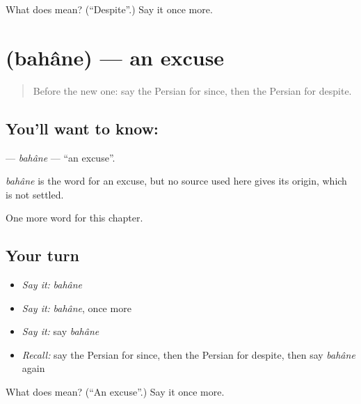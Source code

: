 \begin{tcolorbox}[breakable,colback=teal!4,colframe=teal!35!black,title={Before you move on}]
What does   mean? (\textquotedblleft{}Despite\textquotedblright{}.) Say it once more.
\end{tcolorbox}
\section[\texorpdfstring{\fa{بهانه} (bahâne)}{بهانه (bahâne)}]{ (bahâne) — an excuse}

\label{lesson:FA-C270-bahane}



\begin{quote}
Before the new one: say the Persian for since, then the Persian for despite.
\end{quote}

\subsection*{You'll want to know: }
\textbf{} — \emph{bahâne} — \textquotedblleft{}an excuse\textquotedblright{}.

\begin{cousinweb}
\emph{bahâne} is the word for an excuse, but no source used here gives its origin, which is not settled.
\end{cousinweb}

\begin{grammarlens}[title={What you've built}]
One more word for this chapter.
\end{grammarlens}

\subsection*{Your turn}
\begin{itemize}
\raggedright
  \item \emph{Say it:} \emph{bahâne}
  \item \emph{Say it:} \emph{bahâne}, once more
  \item \emph{Say it:} say \emph{bahâne}
  \item \emph{Recall:} say the Persian for since, then the Persian for despite, then say \emph{bahâne} again
\end{itemize}

\begin{tcolorbox}[breakable,colback=teal!4,colframe=teal!35!black,title={Before you move on}]
What does  mean? (\textquotedblleft{}An excuse\textquotedblright{}.) Say it once more.
\end{tcolorbox}
